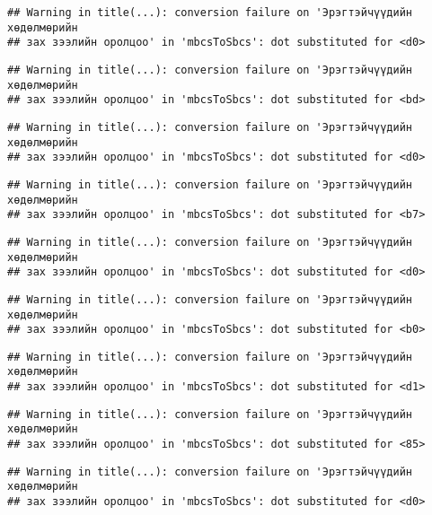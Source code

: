 \documentclass[]{article}
\begin{document}
\begin{verbatim}
## Warning in title(...): conversion failure on 'Эрэгтэйчүүдийн хөдөлмөрийн
## зах зээлийн оролцоо' in 'mbcsToSbcs': dot substituted for <d0>
\end{verbatim}

\begin{verbatim}
## Warning in title(...): conversion failure on 'Эрэгтэйчүүдийн хөдөлмөрийн
## зах зээлийн оролцоо' in 'mbcsToSbcs': dot substituted for <bd>
\end{verbatim}

\begin{verbatim}
## Warning in title(...): conversion failure on 'Эрэгтэйчүүдийн хөдөлмөрийн
## зах зээлийн оролцоо' in 'mbcsToSbcs': dot substituted for <d0>
\end{verbatim}

\begin{verbatim}
## Warning in title(...): conversion failure on 'Эрэгтэйчүүдийн хөдөлмөрийн
## зах зээлийн оролцоо' in 'mbcsToSbcs': dot substituted for <b7>
\end{verbatim}

\begin{verbatim}
## Warning in title(...): conversion failure on 'Эрэгтэйчүүдийн хөдөлмөрийн
## зах зээлийн оролцоо' in 'mbcsToSbcs': dot substituted for <d0>
\end{verbatim}

\begin{verbatim}
## Warning in title(...): conversion failure on 'Эрэгтэйчүүдийн хөдөлмөрийн
## зах зээлийн оролцоо' in 'mbcsToSbcs': dot substituted for <b0>
\end{verbatim}

\begin{verbatim}
## Warning in title(...): conversion failure on 'Эрэгтэйчүүдийн хөдөлмөрийн
## зах зээлийн оролцоо' in 'mbcsToSbcs': dot substituted for <d1>
\end{verbatim}

\begin{verbatim}
## Warning in title(...): conversion failure on 'Эрэгтэйчүүдийн хөдөлмөрийн
## зах зээлийн оролцоо' in 'mbcsToSbcs': dot substituted for <85>
\end{verbatim}

\begin{verbatim}
## Warning in title(...): conversion failure on 'Эрэгтэйчүүдийн хөдөлмөрийн
## зах зээлийн оролцоо' in 'mbcsToSbcs': dot substituted for <d0>
\end{verbatim}
\end{document}
